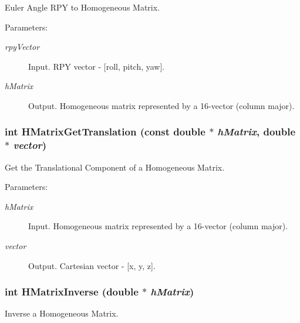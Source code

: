 Euler Angle RPY to Homogeneous Matrix. 

\begin{Desc}
\item[Parameters:]
\begin{description}
\item[{\em rpyVector}]Input. RPY vector - \mbox{[}roll, pitch, yaw\mbox{]}. \item[{\em hMatrix}]Output. Homogeneous matrix represented by a 16-vector (column major). \end{description}
\end{Desc}
\hypertarget{group__homogeneous_gea46cfbea64dcd828a7ad9c0a1a58804}{
\subsubsection[HMatrixGetTranslation]{\setlength{\rightskip}{0pt plus 5cm}int HMatrixGetTranslation (const double $\ast$ {\em hMatrix}, \/  double $\ast$ {\em vector})}}
\label{group__homogeneous_gea46cfbea64dcd828a7ad9c0a1a58804}


Get the Translational Component of a Homogeneous Matrix. 

\begin{Desc}
\item[Parameters:]
\begin{description}
\item[{\em hMatrix}]Input. Homogeneous matrix represented by a 16-vector (column major). \item[{\em vector}]Output. Cartesian vector - \mbox{[}x, y, z\mbox{]}. \end{description}
\end{Desc}
\hypertarget{group__homogeneous_g7e37012b55e5a56c288513e3bace06f7}{
\subsubsection[HMatrixInverse]{\setlength{\rightskip}{0pt plus 5cm}int HMatrixInverse (double $\ast$ {\em hMatrix})}}
\label{group__homogeneous_g7e37012b55e5a56c288513e3bace06f7}


Inverse a Homogeneous Matrix. 

